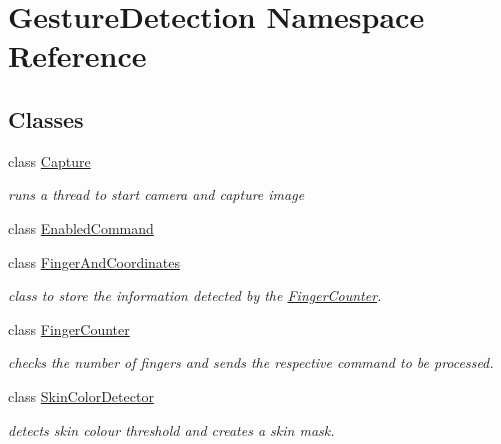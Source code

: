 \hypertarget{namespaceGestureDetection}{}\section{Gesture\+Detection Namespace Reference}
\label{namespaceGestureDetection}
\subsection*{Classes}
\begin{DoxyCompactItemize}
\item 
class \hyperlink{classGestureDetection_1_1Capture}{Capture}
\begin{DoxyCompactList}\small\item\em runs a thread to start camera and capture image \end{DoxyCompactList}\item 
class \hyperlink{classGestureDetection_1_1EnabledCommand}{Enabled\+Command}
\item 
class \hyperlink{classGestureDetection_1_1FingerAndCoordinates}{Finger\+And\+Coordinates}
\begin{DoxyCompactList}\small\item\em class to store the information detected by the \hyperlink{classGestureDetection_1_1FingerCounter}{Finger\+Counter}. \end{DoxyCompactList}\item 
class \hyperlink{classGestureDetection_1_1FingerCounter}{Finger\+Counter}
\begin{DoxyCompactList}\small\item\em checks the number of fingers and sends the respective command to be processed. \end{DoxyCompactList}\item 
class \hyperlink{classGestureDetection_1_1SkinColorDetector}{Skin\+Color\+Detector}
\begin{DoxyCompactList}\small\item\em detects skin colour threshold and creates a skin mask. \end{DoxyCompactList}\end{DoxyCompactItemize}
